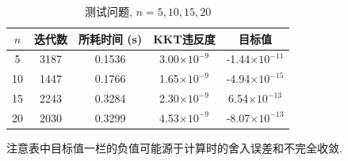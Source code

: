 \documentclass[UTF8,10.5pt,a4paper]{ctexart}
\theoremstyle{definition}
\theoremstyle{definition}
\begin{document}
\begin{table}[htbp]
	\renewcommand{\captionfont}{\small}
	\centering
	\caption{测试问题, $n=5,10,15,20$}
	\label{test}
	\vskip 4mm
	\begin{tabular}{c|c|c|c|c}
		\hline
		$n$ & 迭代数 & 所耗时间 (s) & KKT违反度 & 目标值\\\hline
		5 & 3187 & 0.1536 & 3.00$\times10^{-9}$ & -1.44$\times10^{-11}$\\\hline
		10 & 1447 & 0.1766 & 1.65$\times10^{-9}$ & -4.94$\times10^{-15}$\\\hline
		15 & 2243 & 0.3284 & 2.30$\times10^{-9}$ & 6.54$\times10^{-13}$\\\hline
		20 & 2030 & 0.3299 & 4.53$\times10^{-9}$ & -8.07$\times10^{-13}$\\\hline
	\end{tabular}
\end{table}
\par 注意表中目标值一栏的负值可能源于计算时的舍入误差和不完全收敛.
\end{document}

